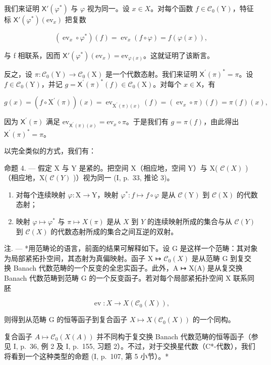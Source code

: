 我们来证明 \(\mathsf{X}'(\varphi^{*})\) 与 \(\varphi\) 视为同一。设 \(x \in X\)。对每个函数 \(f \in \mathcal{C}_{0}(\mathrm{Y})\)，特征标 \(\mathsf{X}'(\varphi^{*})(\mathrm{ev}_{x})\) 把复数

\[
\left(\operatorname{ev} _ {x} \circ \varphi^ {*}\right) (f) = \operatorname{ev} _ {x} (f \circ \varphi) = f (\varphi (x)),
\]

与 f 相联系，因而 \(\mathsf{X}'(\varphi^{*})(\mathrm{ev}_{x}) = \mathrm{ev}_{\varphi(x)}\)。这就证明了该断言。

反之，设 \(\pi\colon\mathcal{C}_{0}(\mathrm{Y})\to\mathcal{C}_{0}(\mathrm{X})\) 是一个代数态射。我们来证明 \(\mathsf{X}^{\prime}(\pi)^{*}=\pi\)。设 \(f\in\mathcal{C}_{0}(\mathrm{Y})\)，并记 \(g=\mathsf{X}^{\prime}(\pi)^{*}(f)\in\mathcal{C}_{0}(\mathrm{X})\)。对每个 \(x\in\mathsf{X}\)，有

\[
g (x) = \left(f \circ \mathrm{X} ^ {\prime} (\pi)\right) (x) = \operatorname{ev} _ {\mathrm{X} ^ {\prime} (\pi) (x)} (f) = \left(\operatorname{ev} _ {x} \circ \pi\right) (f) = \pi (f) (x),
\]

因为 \(\mathsf{X}^{\prime}(\pi)\) 满足 \(\mathrm{ev}_{\mathsf{X}^{\prime}(\pi)(x)} = \mathrm{ev}_{x} \circ \pi\)。于是我们有 \(g = \pi(f)\)，由此得出 \(\mathsf{X}^{\prime}(\pi)^{*} = \pi\)。

以完全类似的方式，我们有：

命题 4. --- 假定 X 与 Y 是紧的。把空间 X（相应地，空间 Y）与 X( \(\mathcal{C}(X)\) )（相应地，X( \(\mathcal{C}(Y)\) )）视为同一 (I, p.~33, 推论 3)。

\begin{enumerate}
\def\labelenumi{\alph{enumi})}
\item
  对每个连续映射 \(\varphi\colon\mathrm{X}\to\mathrm{Y}\)，映射 \(\varphi^{*}\colon f\mapsto f\circ\varphi\) 是从 \(\mathcal{C}(\mathrm{Y})\) 到 \(\mathcal{C}(\mathrm{X})\) 的代数态射；
\item
  映射 \(\varphi \mapsto \varphi^{*}\) 与 \(\pi \mapsto X(\pi)\) 是从 \(X\) 到 \(Y\) 的连续映射所成的集合与从 \(\mathcal{C}(Y)\) 到 \(\mathcal{C}(X)\) 的代数态射所成的集合之间互逆的双射。
\end{enumerate}

注. --- *用范畴论的语言，前面的结果可解释如下。设 G 是这样一个范畴：其对象为局部紧拓扑空间，其态射为真偏映射。函子 X ↦ \(\mathcal{C}_0(X)\) 是从范畴 G 到复交换 Banach 代数范畴的一个反变的全忠实函子。此外，A ↦ X(A) 是从复交换 Banach 代数范畴到范畴 G 的一个反变函子。若对每个局部紧拓扑空间 X 联系同胚

\[
\operatorname{ev} \colon X \to X (\mathscr {C} _ {0} (X)),
\]

则得到从范畴 G 的恒等函子到复合函子 \(X \mapsto X(\mathcal{C}_{0}(X))\) 的一个同构。

复合函子 \(A \mapsto \mathcal{C}_{0}(X(A))\) 并不同构于复交换 Banach 代数范畴的恒等函子（参见 I, p.~36, 例 2 及 I, p.~155, 习题 2）。不过，对于交换星代数（C*-代数），我们将看到一个这种类型的命题 (I, p.~107, 第 5 小节）。*

